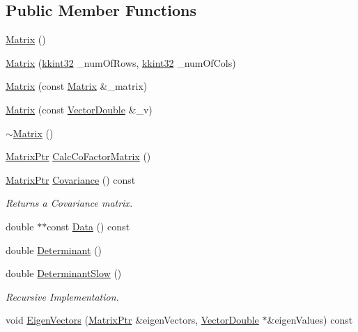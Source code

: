 \subsection*{Public Member Functions}
\begin{DoxyCompactItemize}
\item 
\hyperlink{class_k_k_b_1_1_matrix_a2dba13c45127354c9f75ef576f49269b}{Matrix} ()
\item 
\hyperlink{class_k_k_b_1_1_matrix_a900e01eb3c4f0b082a5457163c6cf2ef}{Matrix} (\hyperlink{namespace_k_k_b_a8fa4952cc84fda1de4bec1fbdd8d5b1b}{kkint32} \+\_\+num\+Of\+Rows, \hyperlink{namespace_k_k_b_a8fa4952cc84fda1de4bec1fbdd8d5b1b}{kkint32} \+\_\+num\+Of\+Cols)
\item 
\hyperlink{class_k_k_b_1_1_matrix_affaa8d1a1cb7710cc0bc72ec73aaea2c}{Matrix} (const \hyperlink{class_k_k_b_1_1_matrix}{Matrix} \&\+\_\+matrix)
\item 
\hyperlink{class_k_k_b_1_1_matrix_a0f87edf7b68d5920fa0bde6fe377d997}{Matrix} (const \hyperlink{namespace_k_k_b_a5906c207479607e5f450434095914a41}{Vector\+Double} \&\+\_\+v)
\item 
\hyperlink{class_k_k_b_1_1_matrix_a9b1c3627f573d78a2f08623fdfef990f}{$\sim$\+Matrix} ()
\item 
\hyperlink{class_k_k_b_1_1_matrix_ad532bd6e9d0aa9b54e78f0feec5741a3}{Matrix\+Ptr} \hyperlink{class_k_k_b_1_1_matrix_a70393cf0584a8a4a2735ad5eba9ae4d0}{Calc\+Co\+Factor\+Matrix} ()
\item 
\hyperlink{class_k_k_b_1_1_matrix_ad532bd6e9d0aa9b54e78f0feec5741a3}{Matrix\+Ptr} \hyperlink{class_k_k_b_1_1_matrix_a99d8b32816b488a4d76597800f30ea70}{Covariance} () const 
\begin{DoxyCompactList}\small\item\em Returns a Covariance matrix. \end{DoxyCompactList}\item 
double $\ast$$\ast$const \hyperlink{class_k_k_b_1_1_matrix_ac9fff89f779f11e382a3ff030e533474}{Data} () const 
\item 
double \hyperlink{class_k_k_b_1_1_matrix_ae93ec6a085d62a87d237786ae1d5657d}{Determinant} ()
\item 
double \hyperlink{class_k_k_b_1_1_matrix_ad93cf1c0613661466547e9f40f0d5b49}{Determinant\+Slow} ()
\begin{DoxyCompactList}\small\item\em Recursive Implementation. \end{DoxyCompactList}\item 
void \hyperlink{class_k_k_b_1_1_matrix_a1d9e7525cebca179d2cefa3c68beb523}{Eigen\+Vectors} (\hyperlink{class_k_k_b_1_1_matrix_ad532bd6e9d0aa9b54e78f0feec5741a3}{Matrix\+Ptr} \&eigen\+Vectors, \hyperlink{namespace_k_k_b_a5906c207479607e5f450434095914a41}{Vector\+Double} $\ast$\&eigen\+Values) const 
$$
\end{DoxyCompactItemize}

